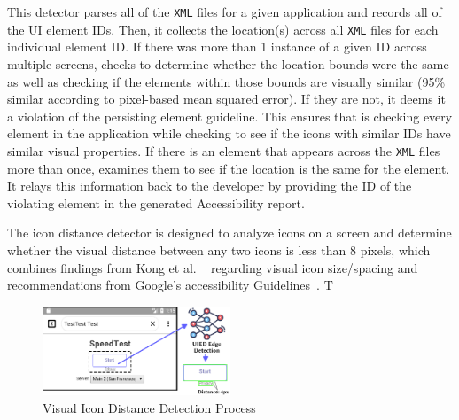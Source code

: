 This detector parses all of the \texttt{\small XML} files for a given application and records all of the UI element IDs. Then, it collects the location(s) across all \texttt{\small XML} files for each individual element ID. If there was more than 1 instance of a given ID across multiple screens, \MotorEase checks to determine whether the location bounds were the same as well as checking if the elements within those bounds are visually similar (95\% similar according to pixel-based mean squared error). If they are not, it deems it a violation of the persisting element guideline. This ensures that \MotorEase is checking every element in the application while checking to see if the icons with similar IDs have similar visual properties.  
If there is an element that appears across the \texttt{\small XML} files more than once, \MotorEase examines them to see if the location is the same for the element. 
It relays this information back to the developer by providing the ID of the violating element in the generated Accessibility report. 


The icon distance detector is designed to analyze icons on a screen and determine whether the visual distance between any two icons is less than 8 pixels, which combines findings from Kong et al. ~\cite{Kong21} regarding visual icon size/spacing and recommendations from Google's accessibility Guidelines~\cite{GoogleAccess}. T

\begin{figure}[h]
    \centering
	
    \includegraphics[width=0.5\textwidth]{imgs/visual-distance.pdf}
    \caption{Visual Icon Distance Detection Process}
    \label{iconViolation}
\end{figure}

